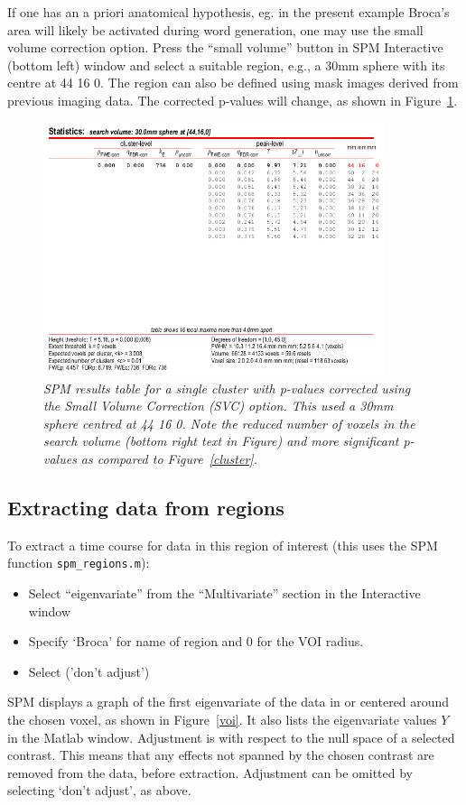 If one has an a priori anatomical hypothesis, eg. in the present example Broca's area will likely be activated during word generation, one may use the small volume correction option. Press the ``small volume'' button in SPM Interactive (bottom left) window and select a suitable region, e.g., a 30mm sphere with its centre at 44 16 0.
The region can also be defined using mask images derived from previous imaging data. The corrected p-values will change,
as shown in Figure~\ref{svc}.
\begin{figure}
\begin{center}
\includegraphics[width=100mm]{pet/svc}
\caption{\em SPM results table for a single cluster with p-values corrected using the Small Volume Correction (SVC) option. This used a 30mm sphere centred at 44 16 0. Note the reduced number of voxels in the search volume (bottom right text in Figure) and more significant p-values as compared to  Figure~\ref{cluster}. \label{svc}}
\end{center}
\end{figure}

\subsection{Extracting data from regions}

To extract a time course for data in this region of interest (this uses the SPM function \texttt{spm\_regions.m}):
\begin{itemize}
\item{Select ``eigenvariate'' from the ``Multivariate'' section in the Interactive window}
\item{Specify `Broca' for name of region and 0 for the VOI radius.}
\item{Select ('don't adjust')}
\end{itemize}
SPM displays a graph of the first eigenvariate of the data in or centered around the chosen voxel, as shown in Figure~\ref{voi}. It also lists the eigenvariate values $Y$ in the Matlab window.  Adjustment is with respect to the null space of a selected contrast.
This means that any effects not spanned by the chosen contrast
are removed from the data, before extraction. Adjustment can be
omitted by selecting `don't adjust', as above.


